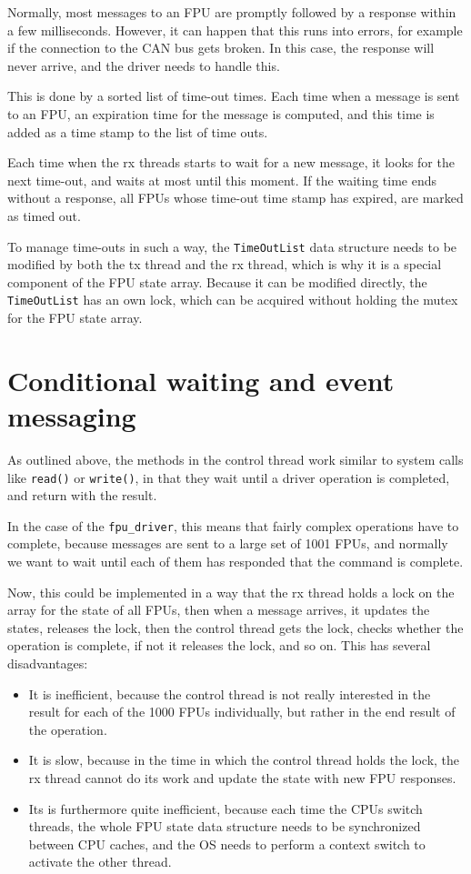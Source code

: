 \documentclass[fontsize=12,a4paper]{scrartcl}
\begin{document}
Normally, most messages to an FPU are promptly followed by a response
within a few milliseconds. However, it can happen that this runs into
errors, for example if the connection to the CAN bus gets broken. In
this case, the response will never arrive, and the driver needs to
handle this.

This is done by a sorted list of time-out times. Each time when a
message is sent to an FPU, an expiration time for the message is
computed, and this time is added as a time stamp to the list of time
outs.

Each time when the rx threads starts to wait for a new message, it
looks for the next time-out, and waits at most until this moment. If
the waiting time ends without a response, all FPUs whose time-out time
stamp has expired, are marked as timed out.

To manage time-outs in such a way, the \texttt{TimeOutList} data
structure needs to be modified by both the tx thread and the rx
thread, which is why it is a special component of the FPU state
array. Because it can be modified directly, the \texttt{TimeOutList}
has an own lock, which can be acquired without holding the mutex for
the FPU state array.


\section{Conditional waiting and event messaging}

As outlined above, the methods in the control thread work similar to
system calls like \texttt{read()} or \texttt{write()}, in that they
wait until a driver operation is completed, and return with the
result.

In the case of the \texttt{fpu\_driver}, this means that fairly complex
operations have to complete, because messages are sent to a large set
of 1001 FPUs, and normally we want to wait until each of them has
responded that the command is complete.

Now, this could be implemented in a way that the rx thread holds a
lock on the array for the state of all FPUs, then when a message
arrives, it updates the states, releases the lock, then the control
thread gets the lock, checks whether the operation is complete, if not
it releases the lock, and so on. This has several disadvantages:

\begin{itemize}
\item It is inefficient, because the control thread is not
  really interested in the result for each of the 1000 FPUs individually,
  but rather in the end result of the operation.
\item It is slow, because in the time in which the control thread holds
  the lock, the rx thread cannot do its work and update the
  state with new FPU responses.
\item Its is furthermore quite inefficient, because each time the CPUs
  switch threads, the whole FPU state data structure needs to be
  synchronized between CPU caches, and the OS needs to perform a
  context switch to activate the other thread.
\end{itemize}
\end{document}

